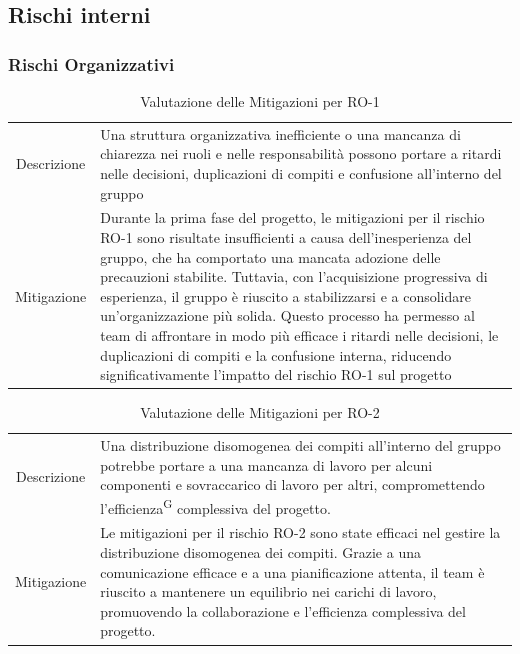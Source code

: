 \documentclass[5pt]{article}
\begin{document}
\subsection{Rischi interni}
\subsubsection{Rischi Organizzativi}

\begin{table}[H]
    \centering
    \begin{tabular}{|c|p{10cm}|}
        \hline
        \rowcolor{teal!50}
        \multicolumn{2}{|c|}{\textbf{RO-1: Organizzazione carente}} \\ 
        \hline
        Descrizione & Una struttura organizzativa inefficiente o una mancanza di chiarezza nei ruoli e nelle responsabilità possono portare a ritardi nelle decisioni, duplicazioni di compiti e confusione all’interno del gruppo \\ \hline
        Mitigazione & Durante la prima fase del progetto, le mitigazioni per il rischio RO-1 sono risultate insufficienti a causa dell'inesperienza del gruppo, che ha comportato una mancata adozione delle precauzioni stabilite. Tuttavia, con l'acquisizione progressiva di esperienza, il gruppo è riuscito a stabilizzarsi e a consolidare un'organizzazione più solida. Questo processo ha permesso al team di affrontare in modo più efficace i ritardi nelle decisioni, le duplicazioni di compiti e la confusione interna, riducendo significativamente l'impatto del rischio RO-1 sul progetto \\ \hline
    \end{tabular}
    \caption{Valutazione delle Mitigazioni per RO-1}
\end{table}

\begin{table}[H]
    \centering
    \begin{tabular}{|c|p{10cm}|}
        \hline
        \rowcolor{teal!50}
        \multicolumn{2}{|c|}{\textbf{RO-2: Distribuzione disomogenea dei compiti }} \\ 
        \hline
        Descrizione & Una distribuzione disomogenea dei compiti all'interno del gruppo potrebbe portare a una mancanza di lavoro per alcuni componenti e sovraccarico di lavoro per altri, compromettendo l'efficienza\textsuperscript{G} complessiva del progetto. \\ \hline
        Mitigazione & Le mitigazioni per il rischio RO-2 sono state efficaci nel gestire la distribuzione disomogenea dei compiti. Grazie a una comunicazione efficace e a una pianificazione attenta, il team è riuscito a mantenere un equilibrio nei carichi di lavoro, promuovendo la collaborazione e l'efficienza complessiva del progetto. \\ \hline
    \end{tabular}
    \caption{Valutazione delle Mitigazioni per RO-2}
\end{table}
\end{document}
